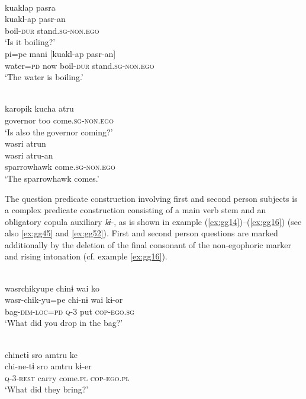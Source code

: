 \documentclass[output=paper]{langsci/langscibook}
\begin{document}
\ea \label{ex:gg12} \ea
    \\
    \glll kuaklap	pasra\\
    kuakl-ap pasr-an\\
         boil-\textsc{dur} stand.\textsc{sg}-\textsc{non.ego}\\
    \glt ‘Is it boiling?’
  \ex
  \\
    \gll pi=pe mani [kuakl-ap pasr-an]\\
         water=\textsc{pd}	now	boil-\textsc{dur} stand.\textsc{sg-non.ego}\\
    \glt ‘The water is boiling.’
\z \z

\ea \label{ex:gg13} \ea
    \\
    \gll karopik	kucha	atru\\
         governor	too	come.\textsc{sg}-\textsc{non.ego}\\
    \glt ‘Is also the governor coming?’
  \ex
  \\
    \glll wasri	atrun\\
    wasri	atru-an\\
    sparrowhawk come.\textsc{sg-non.ego}\\
    \glt ‘The sparrowhawk comes.’
\z \z

The question predicate construction involving first and second person subjects is a complex predicate construction consisting of a main verb stem and an obligatory copula auxiliary \textit{kɨ}-, as is shown in example (\ref{ex:gg14})--(\ref{ex:gg16}) (see also \ref{ex:gg45} and \ref{ex:gg52}). First and second person questions are marked additionally by the deletion of the final consonant of the non-egophoric marker and rising intonation (cf. example \ref{ex:gg16}).

\ea \label{ex:gg14}
    \\
	\glll wasrchikyupe chinɨ wai ko\\
	wasr-chik-yu=pe	chi-nɨ	wai kɨ-or\\
      bag-\textsc{dim-loc=pd}	\textsc{q}-3 put \textsc{cop-ego.sg}\\
	\glt ‘What did you drop in the bag?’
	\z
	
	
\ea \label{ex:gg15}
    \\
	\glll chinetɨ	sro	amtru ke\\ 
	chi-ne-tɨ	sro	amtru kɨ-er\\
      \textsc{q}-3-\textsc{rest} carry come.\textsc{pl} \textsc{cop-ego.pl}\\
	\glt ‘What did they bring?’
	\z
	
\end{document}
